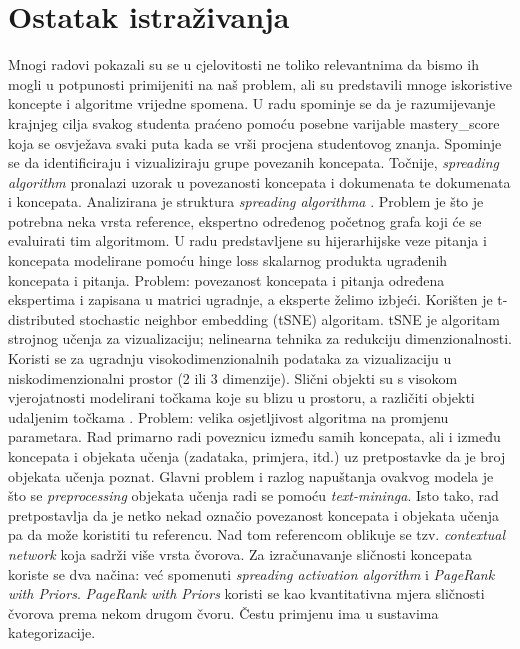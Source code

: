 \documentclass[times, utf8,projekt]{fer}
\begin{document}
\section{Ostatak istraživanja}
Mnogi radovi pokazali su se u cjelovitosti ne toliko relevantnima da bismo ih mogli u potpunosti primijeniti na naš problem, ali su predstavili mnoge iskoristive koncepte i algoritme vrijedne spomena.\newline
\newline
U radu \citep{ct10} spominje se da je razumijevanje krajnjeg cilja svakog studenta praćeno pomoću posebne varijable mastery\_score koja se osvježava svaki puta kada se vrši procjena studentovog znanja. \newline
Spominje se da identificiraju i vizualiziraju grupe povezanih koncepata. Točnije, \textit{spreading algorithm} pronalazi uzorak u povezanosti koncepata i dokumenata te dokumenata i koncepata. Analizirana je struktura \textit{spreading algorithma} \citep{ct11}.\newline
Problem je što je potrebna neka vrsta reference, ekspertno određenog početnog grafa koji će se evaluirati tim algoritmom.\newline
\newline
U radu \citep{12} predstavljene su hijerarhijske veze pitanja i koncepata modelirane pomoću hinge loss skalarnog produkta ugrađenih koncepata i pitanja. Problem: povezanost koncepata i pitanja određena ekspertima i zapisana u matrici ugradnje, a eksperte želimo izbjeći. Korišten je t-distributed stochastic neighbor embedding (tSNE) algoritam.
tSNE je algoritam strojnog učenja za vizualizaciju; nelinearna tehnika za redukciju dimenzionalnosti. Koristi se za ugradnju visokodimenzionalnih podataka za vizualizaciju u niskodimenzionalni prostor (2 ili 3 dimenzije). Slični objekti su s visokom vjerojatnosti modelirani točkama koje su blizu u prostoru, a različiti objekti udaljenim točkama \citep{13}.
Problem: velika osjetljivost algoritma na promjenu parametara.\newline
\newline
Rad \citep{14} primarno radi poveznicu između samih koncepata, ali i između koncepata i objekata učenja (zadataka, primjera, itd.) uz pretpostavke da je broj objekata učenja poznat. Glavni problem i razlog napuštanja ovakvog modela je što se \textit{preprocessing} objekata učenja radi se pomoću \textit{text-mininga}. Isto tako, rad pretpostavlja da je netko nekad označio povezanost koncepata i objekata učenja pa da može koristiti tu referencu. Nad tom referencom oblikuje se tzv. \textit{contextual network} koja sadrži više vrsta čvorova. Za izračunavanje sličnosti koncepata koriste se dva načina: već spomenuti \textit{spreading activation algorithm} i \textit{PageRank with Priors}.\textit{ PageRank with Priors} koristi se kao kvantitativna mjera sličnosti čvorova prema nekom drugom čvoru. Čestu primjenu ima u sustavima kategorizacije.
\end{document}
